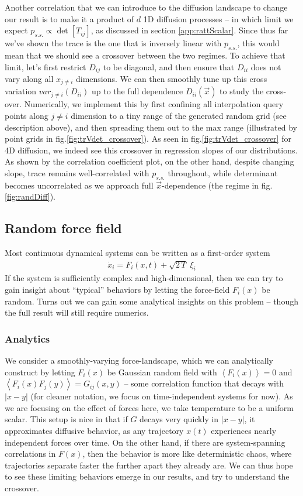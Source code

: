 \documentclass[reprint,prx]{revtex4-1}
\renewcommand{\=}[1]{\stackrel{#1}{=}} %
\renewcommand{\(}{\left (}
\renewcommand{\)}{\right  )}
\renewcommand{\[}{\left [}
\renewcommand{\]}{\right ]}
\newcommand{\<}{\left <}
\renewcommand{\>}{\right >}
\theoremstyle{definition}
\theoremstyle{remark}
\begin{document}
Another correlation that we can introduce to the diffusion landscape to change our result is to make it a product of $ d $ 1D diffusion processes -- in which limit we expect $ p_{s.s.}\propto \det\[T_{ij}\] $, as discussed in section \ref{app:rattScalar}. Since thus far we've shown the trace is the one that is inversely linear with $ p_{s.s.} $, this would mean that we should see a crossover between the two regimes. To achieve that limit, let's first restrict $ D_{ij} $ to be diagonal, and then ensure that $ D_{ii} $ does not vary along all $ x_{j\neq i} $ dimensions. We can then smoothly tune up this cross variation $ var_{j\neq i}(D_{ii}) $ up to the full dependence $ D_{ii}(\vec{x}) $ to study the cross-over. Numerically, we implement this by first confining all interpolation query points along $ j\neq i $ dimension to a tiny range of the generated random grid (see description above), and then spreading them out to the max range (illustrated by point grids in fig.\ref{fig:trVdet_crossover}). As seen in fig.\ref{fig:trVdet_crossover} for 4D diffusion, we indeed see this crossover in regression slopes of our distributions. As shown by the correlation coefficient plot, on the other hand, despite changing slope, trace remains well-correlated with $ p_{s.s.} $ throughout, while determinant becomes uncorrelated as we approach full $ \vec{x} $-dependence (the regime in fig.\ref{fig:randDiff}).

\subsection{Random force field}

Most continuous dynamical systems can be written as a first-order system
\begin{align*}
\dot{x}_i = F_i(x,t)+\sqrt{2\,T}\;\xi_i
\end{align*}
If the system is sufficiently complex and high-dimensional, then we can try to gain insight about ``typical'' behaviors by letting the force-field $ F_i(x) $ be random. Turns out we can gain some analytical insights on this problem -- though the full result will still require numerics. 

\subsubsection{Analytics}
We consider a smoothly-varying force-landscape, which we can analytically construct by letting $ F_i(x) $ be Gaussian random field with $ \<F_i(x)\>=0 $ and $ \<F_i(x) F_j(y)\>=G_{ij}(x,y) $ -- some correlation function that decays with $ |x-y| $ (for cleaner notation, we focus on time-independent systems for now). As we are focusing on the effect of forces here, we take temperature to be a uniform scalar. This setup is nice in that if $ G $ decays very quickly in $ |x-y| $, it approximates diffusive behavior, as any trajectory $ x(t) $ experiences nearly independent forces over time. On the other hand, if there are system-spanning correlations in $ F(x) $, then the behavior is more like deterministic chaos, where trajectories separate faster the further apart they already are. We can thus hope to see these limiting behaviors emerge in our results, and try to understand the crossover.
\end{document}
